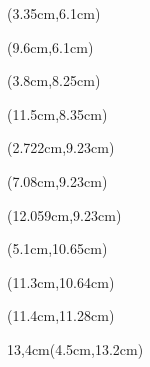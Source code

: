 \documentclass[a4paper]{article}
\begin{document}
\begin{Form}
\begin{textblock*}{0.3cm}(3.35cm,6.1cm) %
\end{textblock*}

\begin{textblock*}{0.3cm}(9.6cm,6.1cm) %
\end{textblock*}


\begin{textblock*}{5.3cm}(3.8cm,8.25cm) %
  \TextField[name=nameTextField, backgroundcolor=gray!20, borderwidth=0, width=5.3cm, value={\Name}]{}
\end{textblock*}

\begin{textblock*}{6.5cm}(11.5cm,8.35cm) %
  \Vorname
\end{textblock*}

\begin{textblock*}{0.3cm}(2.722cm,9.23cm) %
\end{textblock*}

\begin{textblock*}{0.3cm}(7.08cm,9.23cm) %
\end{textblock*}

\begin{textblock*}{0.3cm}(12.059cm,9.23cm) %
\end{textblock*}

\begin{textblock*}{2.8cm}(5.1cm,10.65cm) %
 \Geburtsdatum
\end{textblock*}

\begin{textblock*}{6.7cm}(11.3cm,10.64cm) %
\end{textblock*}

\begin{textblock*}{6cm}(11.4cm,11.28cm) %
\Aufenthaltsort
\end{textblock*}

\begin{textblock*}{13,4cm}(4.5cm,13.2cm) %
\Firma
\end{textblock*}


\end{Form}
\end{document}
